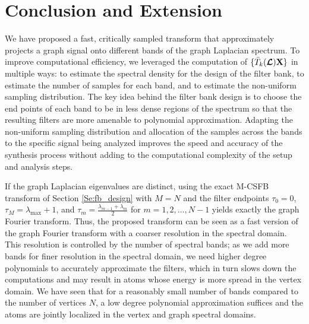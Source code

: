 \documentclass[journal, 10pt]{IEEEtran}
\begin{document}






\section{Conclusion and Extension}
\label{Sec:ongoing}
We have proposed a fast, critically sampled transform that approximately projects a graph signal onto different bands of the graph Laplacian spectrum. To improve computational efficiency, we leveraged the computation of $\{\bar{T}_k(\boldsymbol{\mathcal{L}}){\bf X}\}$ in multiple ways: to estimate the spectral density for the design of the filter bank, to estimate the number of samples for each band, and to estimate the non-uniform sampling distribution. The key idea behind the filter bank design is to choose the end points of each band to be in less dense regions of the spectrum so that the resulting filters are more amenable to polynomial approximation. Adapting the non-uniform sampling distribution and allocation of the samples across the bands to the specific signal being analyzed improves the speed and accuracy of the synthesis process without adding to the computational complexity of the setup and analysis steps. 

If the graph Laplacian eigenvalues are distinct, using the exact M-CSFB transform of Section \ref{Se:fb_design} with $M=N$ and the filter endpoints $\tau_0=0$, $\tau_M = \lambda_{\max}+1$, and $\tau_m=\frac{\lambda_{m-1}+\lambda_m}{2}$ for $m=1,2,\ldots,N-1$ yields exactly the graph Fourier transform. Thus, the proposed transform can be seen as a fast version of the graph Fourier transform with a coarser resolution in the spectral domain. This resolution is controlled by the number of spectral bands; as we add more bands for finer resolution in the spectral domain, we need higher degree polynomials to accurately approximate the filters, which in turn slows down the computations and may result in atoms whose energy is more spread in the vertex domain. We have seen that for a reasonably small number of bands compared to the number of vertices $N$, a low degree polynomial approximation suffices and the atoms are jointly localized in the vertex and graph spectral domains. 
\end{document}
